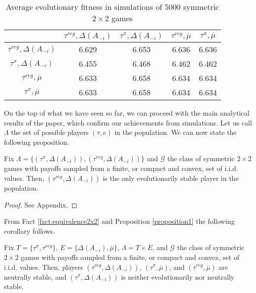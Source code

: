 \documentclass[fleqn,reqno,11pt]{article}
\begin{document}
\begin{table*}[ht]
\centering
\begin{tabular}{ccccc}
  \hline
 & $\tau^{reg}, \Delta(A_{-i})$ 
 & $\tau^{\pi}, \Delta(A_{-i})$ 
 & $\tau^{reg}, \overline{\mu}$ 
 & $\tau^{\pi}, \overline{\mu}$ \\ 
  \hline
  $\tau^{reg}, \Delta(A_{-i})$ & 6.629 & 6.653 &  6.636 & 6.636  \\ 
  $\tau^{\pi}, \Delta(A_{-i})$  & 6.455 & 6.468 & 6.462 & 6.462  \\ 
  $\tau^{reg}, \overline{\mu}$ & 6.633 & 6.658 & 6.634 & 6.634  \\ 
  $\tau^{\pi}, \overline{\mu}$ & 6.633 & 6.658 & 6.634 & 6.634  \\   
   \hline
\end{tabular}
\caption{Average evolutionary fitness in simulations of 5000 symmetric $2 \times 2$ games}
\label{tab:reg vs obj 2}
\end{table*}


On the top of what we have seen so far, we can proceed with the main analytical results of the paper, which confirm our achievements from simulations. Let us call $\Lambda$ the set of possible players $( \tau, e  )$ in the population. We can now state the following proposition. 

\begin{proposition} \label{proposition1}

Fix $\Lambda = \lbrace (\tau^{\pi}, \Delta(A_{-i})), (\tau^{reg}, \Delta(A_{-i})) \rbrace$ and $\mathcal{G}$ the class of symmetric $2 \times 2$ games with payoffs sampled from a finite, or compact and convex, set of i.i.d. values. Then, $(\tau^{reg}, \Delta(A_{-i}))$ is the only evolutionarily stable player in the population.

\end{proposition}

\begin{proof}
See Appendix.
\end{proof}

From Fact \ref{fact:equivalence2x2} and Proposition \ref{proposition1} the following corollary follows.

\begin{corollary} \label{corollary1}

Fix $T = \lbrace \tau^{\pi}, \tau^{reg} \rbrace$, $E = \lbrace \Delta(A_{-i}), \overline{\mu}  \rbrace$, $\Lambda= T \times E$, and $\mathcal{G}$ the class of symmetric $2 \times 2$ games with payoffs sampled from a finite, or compact and convex, set of i.i.d. values. Then, players $(\tau^{reg}, \Delta(A_{-i}))$, $(\tau^{\pi}, \overline{\mu})$, and $(\tau^{reg}, \overline{\mu})$ are neutrally stable, and $(\tau^{\pi}, \Delta(A_{-i}))$ is neither evolutionarily nor neutrally stable.

\end{corollary}
\end{document}
